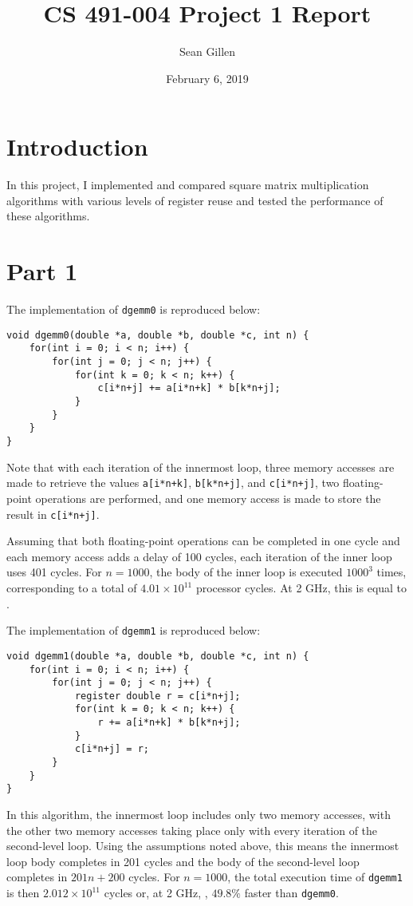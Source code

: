 \documentclass[12pt,letterpaper,oneside]{article}
\begin{document}
\title{CS 491-004 Project 1 Report}
\author{Sean Gillen}
\date{February 6, 2019}
\maketitle

\section*{Introduction}
In this project, I implemented and compared square matrix multiplication algorithms with
various levels of register reuse and tested the performance of these algorithms.

\section*{Part 1}
The implementation of \texttt{dgemm0} is reproduced below:
\begin{verbatim}
void dgemm0(double *a, double *b, double *c, int n) {
    for(int i = 0; i < n; i++) {
        for(int j = 0; j < n; j++) {
            for(int k = 0; k < n; k++) {
                c[i*n+j] += a[i*n+k] * b[k*n+j];
            }
        }
    }
}
\end{verbatim}
Note that with each iteration of the innermost loop, three memory accesses are made to retrieve the values
\texttt{a[i*n+k]}, \texttt{b[k*n+j]}, and \texttt{c[i*n+j]}, two floating-point operations are performed, and 
one memory access is made to store the result in \texttt{c[i*n+j]}.

Assuming that both floating-point operations can be completed in one cycle and each memory access adds a delay
of 100 cycles, each iteration of the inner loop uses 401 cycles. For $n=1000$, the body of the inner loop
is executed $1000^3$ times, corresponding to a total of $4.01\times10^{11}$ processor cycles. 
At 2 GHz, this is equal to .

The implementation of \texttt{dgemm1} is reproduced below:
\begin{verbatim}
void dgemm1(double *a, double *b, double *c, int n) {
    for(int i = 0; i < n; i++) {
        for(int j = 0; j < n; j++) {
            register double r = c[i*n+j];
            for(int k = 0; k < n; k++) {
                r += a[i*n+k] * b[k*n+j];
            }
            c[i*n+j] = r;
        }
    }
}
\end{verbatim}
In this algorithm, the innermost loop includes only two memory accesses, with the other two memory accesses taking
place only with every iteration of the second-level loop. Using the assumptions noted above, this means the innermost loop body completes in 201 cycles
and the body of the second-level loop completes in $201n+200$ cycles. For $n=1000$, the total execution time
of \texttt{dgemm1} is then $2.012\times10^{11}$ cycles or, at 2 GHz, , $49.8\%$ faster than \texttt{dgemm0}.
\end{document}
